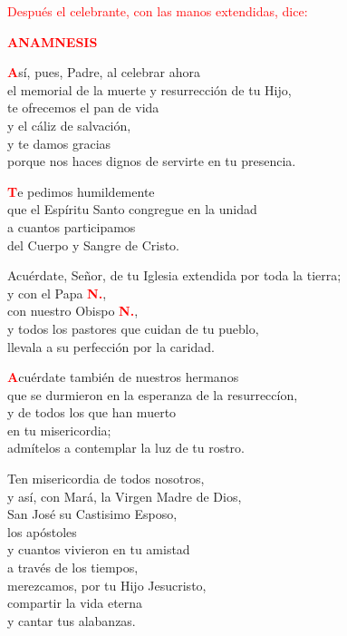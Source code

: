 \documentclass[12pt, letterpaper]{article}
\begin{document}
  \large{\textcolor{red}{Despu\'es el celebrante, con las manos extendidas, dice:}} 

  \Large {\bfseries \textcolor{red}{ANAMNESIS}}

  \lettrine[lines=2]{\bfseries \textcolor{red}{A}}{}\Large s\'i, pues, Padre, al celebrar ahora\\ 
  el memorial de la muerte y resurrecci\'on de tu Hijo,\\
  te ofrecemos el pan de vida\\
  y el c\'aliz de salvaci\'on,\\
  y te damos gracias\\
  porque nos haces dignos de servirte en tu presencia.

  \lettrine[lines=2]{\bfseries \textcolor{red}{T}}{}\Large e pedimos humildemente\\
  que el Esp\'iritu Santo congregue en la unidad\\
  a cuantos participamos\\
  del Cuerpo y Sangre de Cristo.

  \noindent
  Acu\'erdate, Se\~nor, de tu Iglesia extendida por toda la tierra; \\
  y con el Papa {\bfseries \textcolor{red}{N.}},\\ 
  con nuestro Obispo {\bfseries \textcolor{red}{N.}},\\
  y todos los pastores que cuidan de tu pueblo,\\
  llevala a su perfecci\'on por la caridad.

  \lettrine[lines=2]{\bfseries \textcolor{red}{A}}{}\Large cu\'erdate tambi\'en de nuestros hermanos\\
  que se durmieron en la esperanza de la resurrecc\'ion,\\
  y de todos los que han muerto\\ 
  en tu misericordia;\\
  adm\'itelos a contemplar la luz de tu rostro.

  \noindent
  Ten misericordia de todos nosotros,\\
  y as\'i, con Mar\'a, la Virgen Madre de Dios,\\
  San Jos\'e su Castisimo Esposo, \\
  los ap\'ostoles\\
  y cuantos vivieron en tu amistad\\
  a trav\'es de los tiempos,\\
  merezcamos, por tu Hijo Jesucristo,\\
  compartir la vida eterna\\
  y cantar tus alabanzas. 
\end{document}
